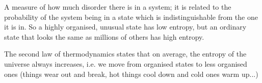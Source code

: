 A measure of how much disorder there is in a system;
it is related to the probability of the system being
in a state which is indistinguishable from the one it is
in. So a highly organised, unusual state has low entropy,
but an ordinary state that looks the same as millions of 
others has high entropy.
\par
The second law of thermodynamics states that on average,
the entropy of the universe always increases, i.e. we move
from organised states to less organised ones (things wear
out and break, hot things cool down and cold ones warm up...)